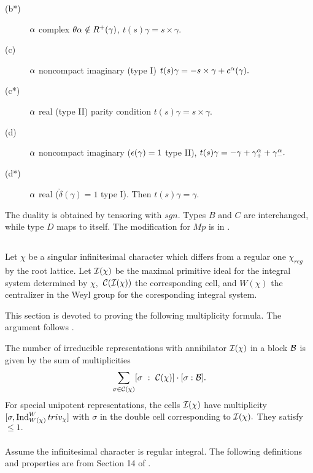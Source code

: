 \documentclass[11pt ,reqno]{amsart}
\begin{document}
\begin{definition}
\begin{description}
\item[(b*) ] ${\alpha}$ complex $\theta{\alpha}\notin R^+(\gamma)$,
$t(s)\gamma=s\times\gamma$.
\item[(c) ] ${\alpha}$ noncompact imaginary (type I)
  $t(s)\gamma=-s\times\gamma+ c^{\alpha}(\gamma).$
\item[(c*) ] ${\alpha}$ real  (type II) parity condition
  $t(s)\gamma=s\times\gamma.$
\item[(d) ] ${\alpha}$ noncompact imaginary (${\epsilon}(\gamma)=1$ type II),\newline
$t(s)\gamma=-\gamma +\gamma^{\alpha}_++\gamma^{\alpha}_-.$ 
\item[(d*) ] ${\alpha}$ real ($\check\delta(\gamma)=1$ type I). Then
  $t(s)\gamma=\gamma.$
\end{description}
\end{definition}

The duality is obtained by tensoring with $sgn.$ Types $B$ and $C$ are
interchanged, while type $D$ maps to itself. The modification for $Mp$
is in \cite{RT}. 

\subsection{} 
{
Let $\chi$ be a singular infinitesimal character which
differs from a regular one $\chi_{reg}$ by the root lattice. Let
${\mathcal I}(\chi)$ be the maximal primitive ideal for the
integral system determined by $\chi,$  ${\mathcal C}({\mathcal I}(\chi))$ the corresponding cell, and $W(\chi)$ the centralizer in the
Weyl group for the coresponding integral system.

This section is devoted to proving the following multiplicity formula. The argument follows \cite{McG}. 
\begin{theorem}\label{t:mult}
The number of irreducible representations with annihilator ${\mathcal I}(\chi)$ in a block ${\mathcal B}$ is given by the sum of
multiplicities
$$
\sum_{{\sigma}\in{\mathcal C}(\chi)}[{\sigma}\ :\ {\mathcal C}(\chi)]\cdot[{\sigma}:{\mathcal B}].
$$
For special unipotent representations, the cells ${\mathcal I}(\chi)$ have
 multiplicity \newline $[{\sigma},\operatorname{Ind}_{W(\chi)}^W triv_\chi]$ with
 $\sigma$ in the double cell corresponding to ${\mathcal I}(\chi).$ They satisfy
 $\le 1.$  
\end{theorem}
}

\subsubsection{}
Assume the infinitesimal character is regular integral. The following
definitions and properties are from Section 14 of  \cite{V4}.
\end{document}
